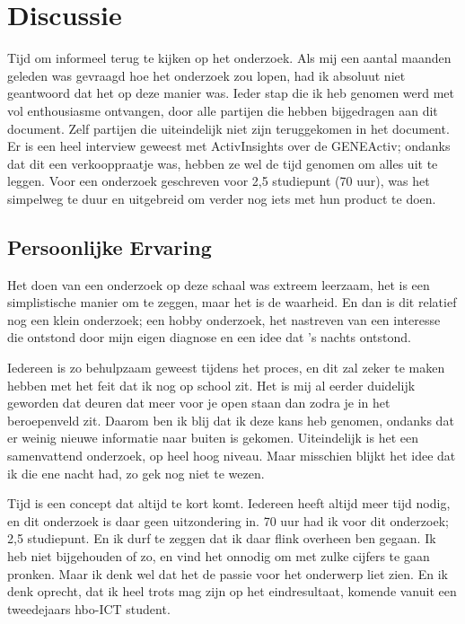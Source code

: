 \section{Discussie}
\label{section:discussion}

Tijd om informeel terug te kijken op het onderzoek. 
Als mij een aantal maanden geleden was gevraagd hoe het onderzoek zou lopen,
had ik absoluut niet geantwoord dat het op deze manier was.
Ieder stap die ik heb genomen werd met vol enthousiasme ontvangen,
door alle partijen die hebben bijgedragen aan dit document.
Zelf partijen die uiteindelijk niet zijn teruggekomen in het document.
Er is een heel interview geweest met ActivInsights over de GENEActiv;
ondanks dat dit een verkooppraatje was, hebben ze wel de tijd genomen om alles uit te leggen.
Voor een onderzoek geschreven voor 2,5 studiepunt (70 uur),
was het simpelweg te duur en uitgebreid om verder nog iets met hun product te doen.

\subsection*{Persoonlijke Ervaring}

Het doen van een onderzoek op deze schaal was extreem leerzaam,
het is een simplistische manier om te zeggen, maar het is de waarheid.
En dan is dit relatief nog een klein onderzoek; een hobby onderzoek,
het nastreven van een interesse die ontstond door mijn eigen diagnose en een idee dat 's nachts ontstond.

Iedereen is zo behulpzaam geweest tijdens het proces,
en dit zal zeker te maken hebben met het feit dat ik nog op school zit.
Het is mij al eerder duidelijk geworden dat deuren dat meer voor je open staan dan zodra je in het beroepenveld zit.
Daarom ben ik blij dat ik deze kans heb genomen, ondanks dat er weinig nieuwe informatie naar buiten is gekomen.
Uiteindelijk is het een samenvattend onderzoek, op heel hoog niveau.
Maar misschien blijkt het idee dat ik die ene nacht had, zo gek nog niet te wezen.

Tijd is een concept dat altijd te kort komt. Iedereen heeft altijd meer tijd nodig,
en dit onderzoek is daar geen uitzondering in. 70 uur had ik voor dit onderzoek; 2,5 studiepunt.
En ik durf te zeggen dat ik daar flink overheen ben gegaan. Ik heb niet bijgehouden of zo,
en vind het onnodig om met zulke cijfers te gaan pronken. Maar ik denk wel dat het de passie voor het onderwerp liet zien.
En ik denk oprecht, dat ik heel trots mag zijn op het eindresultaat,
komende vanuit een tweedejaars hbo-ICT student.

